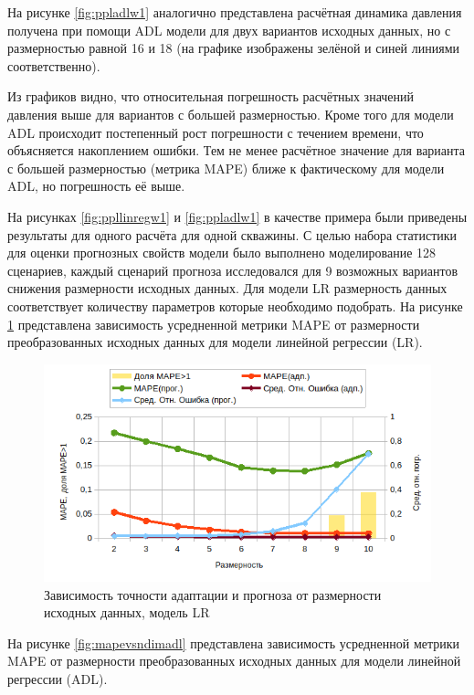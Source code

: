 \documentclass[14pt]{article}
\begin{document}
 	На рисунке \ref{fig:ppladlw1} аналогично представлена расчётная динамика давления получена при помощи ADL модели для двух вариантов исходных данных, но с размерностью равной 16 и 18 (на графике изображены зелёной и синей линиями соответственно).
 	
 	Из графиков видно, что относительная погрешность расчётных значений давления выше для вариантов с большей размерностью. Кроме того для модели ADL происходит постепенный рост погрешности с течением времени, что объясняется накоплением ошибки. Тем не менее расчётное значение для варианта с большей размерностью (метрика MAPE) ближе к фактическому для модели ADL, но погрешность её выше.  
 
 	На рисунках \ref{fig:ppllinregw1} и \ref{fig:ppladlw1} в качестве примера были приведены результаты для одного расчёта для одной скважины. С целью набора статистики для оценки прогнозных свойств модели было выполнено моделирование 128 сценариев, каждый сценарий прогноза исследовался для 9 возможных вариантов снижения размерности исходных данных. Для модели LR размерность данных соответствует количеству параметров которые необходимо подобрать. 
 	На рисунке \ref{fig:mapevsndimlr} представлена зависимость усредненной метрики MAPE от размерности преобразованных исходных данных для модели линейной регрессии (LR). 

\begin{figure}
	\centering
	\includegraphics[width=0.9\linewidth]{mape_vs_ndim_lr}
	\caption{Зависимость точности адаптации и прогноза от размерности исходных данных, модель LR}
	\label{fig:mapevsndimlr}
\end{figure}

	На рисунке \ref{fig:mapevsndimadl} представлена зависимость усредненной метрики MAPE от размерности преобразованных исходных данных для модели линейной регрессии (ADL).
\end{document}
